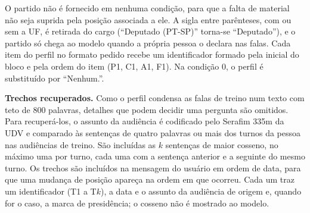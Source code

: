 O partido não é fornecido em nenhuma condição, para que a falta de material não seja suprida pela
posição associada a ele. A sigla entre parênteses, com ou sem a UF, é retirada do cargo (``Deputado
(PT-SP)'' torna-se ``Deputado''), e o partido só chega ao modelo quando a própria pessoa o declara
nas falas. Cada item do perfil no formato pedido recebe um identificador formado pela inicial do
bloco e pela ordem do item (P1, C1, A1, F1). Na condição 0, o perfil é substituído por ``Nenhum.''.

\textbf{Trechos recuperados.} Como o perfil condensa as falas de treino num texto com teto de 800
palavras, detalhes que podem decidir uma pergunta são omitidos. Para recuperá-los, o assunto da
audiência é codificado pelo Serafim 335m da UDV e comparado às sentenças de quatro palavras ou mais
dos turnos da pessoa nas audiências de treino. São incluídas as $k$ sentenças de maior cosseno, no
máximo uma por turno, cada uma com a sentença anterior e a seguinte do mesmo turno. Os trechos são
incluídos na mensagem do usuário em ordem de data, para que uma mudança de posição apareça na ordem
em que ocorreu. Cada um traz um identificador (T1 a T$k$), a data e o assunto da audiência de origem
e, quando for o caso, a marca de presidência; o cosseno não é mostrado ao modelo.
